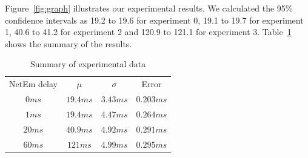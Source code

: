 \documentclass[conference]{IEEEtran}
\begin{document}
Figure~\ref{fig:graph} illustrates our experimental results.
We calculated the 95\% confidence intervals as 19.2 to 19.6 for experiment 0,
19.1 to 19.7 for experiment 1, 40.6 to 41.2 for experiment 2 and 120.9 to 121.1
for experiment 3. Table~\ref{table:data} shows the summary of the results.\\

\begin{table}
    \centering
    \begin{tabular}{c c c c}
        \toprule
        NetEm delay & $\mu$ & $\sigma$ & Error \\
        $0ms$   &    $19.4ms$   &   $3.43ms$    &   $0.203ms$ \\
        $1ms$   &    $19.4ms$   &   $4.47ms$    &   $0.264ms$ \\
        $20ms$   &    $40.9ms$   &   $4.92ms$    &   $0.291ms$ \\
        $60ms$   &    $121ms$   &   $4.99ms$    &   $0.295ms$ \\
        \bottomrule
    \end{tabular}\label{table:data} \\
    \caption{Summary of experimental data}\label{table:data}
\end{table}
\end{document}

